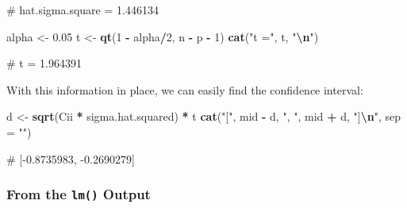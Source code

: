 \documentclass[
  a4paper,
]{article}
\newenvironment{Shaded}{\begin{snugshade}}{\end{snugshade}}
\newcommand{\AttributeTok}[1]{\textcolor[rgb]{0.13,0.29,0.53}{#1}}
\newcommand{\DecValTok}[1]{\textcolor[rgb]{0.00,0.00,0.81}{#1}}
\newcommand{\FloatTok}[1]{\textcolor[rgb]{0.00,0.00,0.81}{#1}}
\newcommand{\FunctionTok}[1]{\textcolor[rgb]{0.13,0.29,0.53}{\textbf{#1}}}
\newcommand{\NormalTok}[1]{#1}
\newcommand{\OtherTok}[1]{\textcolor[rgb]{0.56,0.35,0.01}{#1}}
\newcommand{\SpecialCharTok}[1]{\textcolor[rgb]{0.81,0.36,0.00}{\textbf{#1}}}
\newcommand{\StringTok}[1]{\textcolor[rgb]{0.31,0.60,0.02}{#1}}
\theoremstyle{definition}
\theoremstyle{definition}
\theoremstyle{definition}
\theoremstyle{definition}
\theoremstyle{remark}
\begin{document}
\begin{Shaded}
\begin{Highlighting}[]
\NormalTok{\# hat.sigma.square = 1.446134}
\end{Highlighting}
\end{Shaded}

\begin{Shaded}
\begin{Highlighting}[]
\NormalTok{alpha }\OtherTok{\textless{}{-}} \FloatTok{0.05}
\NormalTok{t }\OtherTok{\textless{}{-}} \FunctionTok{qt}\NormalTok{(}\DecValTok{1} \SpecialCharTok{{-}}\NormalTok{ alpha}\SpecialCharTok{/}\DecValTok{2}\NormalTok{, n }\SpecialCharTok{{-}}\NormalTok{ p }\SpecialCharTok{{-}} \DecValTok{1}\NormalTok{)}
\FunctionTok{cat}\NormalTok{(}\StringTok{"t ="}\NormalTok{, t, }\StringTok{"}\SpecialCharTok{\textbackslash{}n}\StringTok{"}\NormalTok{)}
\end{Highlighting}
\end{Shaded}

\begin{Shaded}
\begin{Highlighting}[]
\NormalTok{\# t = 1.964391}
\end{Highlighting}
\end{Shaded}

With this information in place, we can easily find the confidence
interval:

\begin{Shaded}
\begin{Highlighting}[]
\NormalTok{d }\OtherTok{\textless{}{-}} \FunctionTok{sqrt}\NormalTok{(Cii }\SpecialCharTok{*}\NormalTok{ sigma.hat.squared) }\SpecialCharTok{*}\NormalTok{ t}
\FunctionTok{cat}\NormalTok{(}\StringTok{"["}\NormalTok{, mid }\SpecialCharTok{{-}}\NormalTok{ d, }\StringTok{", "}\NormalTok{, mid }\SpecialCharTok{+}\NormalTok{ d, }\StringTok{"]}\SpecialCharTok{\textbackslash{}n}\StringTok{"}\NormalTok{, }\AttributeTok{sep =} \StringTok{""}\NormalTok{)}
\end{Highlighting}
\end{Shaded}

\begin{Shaded}
\begin{Highlighting}[]
\NormalTok{\# [{-}0.8735983, {-}0.2690279]}
\end{Highlighting}
\end{Shaded}

\subsubsection{\texorpdfstring{From the \texttt{lm()} Output}{From the lm() Output}}\label{from-the-lm-output}
\end{document}
